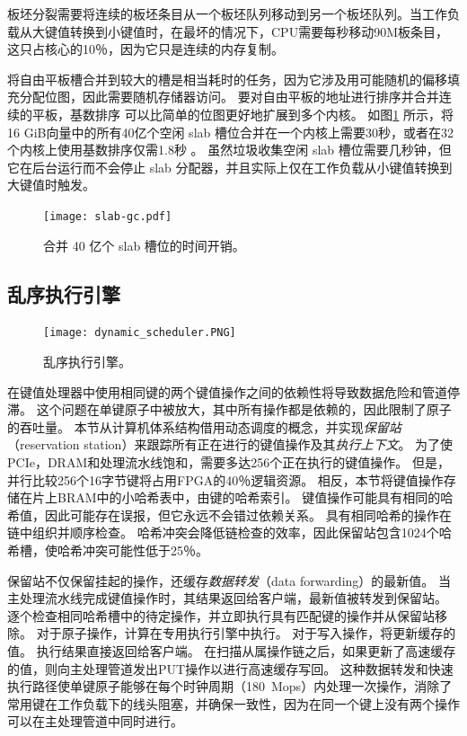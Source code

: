 板坯分裂需要将连续的板坯条目从一个板坯队列移动到另一个板坯队列。当工作负载从大键值转换到小键值时，在最坏的情况下，CPU需要每秒移动90M板条目，这只占核心的10％，因为它只是连续的内存复制。

将自由平板槽合并到较大的槽是相当耗时的任务，因为它涉及用可能随机的偏移填充分配位图，因此需要随机存储器访问。
要对自由平板的地址进行排序并合并连续的平板，基数排序 \cite {satish2010fast} 可以比简单的位图更好地扩展到多个内核。
如图\ref {kvdirect:fig:slab-garbage-collection} 所示，将16 GiB向量中的所有40亿个空闲 slab 槽位合并在一个内核上需要30秒，或者在32个内核上使用基数排序仅需1.8秒 \cite{satish2010fast}。
虽然垃圾收集空闲 slab 槽位需要几秒钟，但它在后台运行而不会停止 slab 分配器，并且实际上仅在工作负载从小键值转换到大键值时触发。


\begin{figure}[t]
	\centering
	\texttt{[image: slab-gc.pdf]}
	\caption{合并 40 亿个 slab 槽位的时间开销。}
	\label{kvdirect:fig:slab-garbage-collection}
\end{figure}




\subsection{乱序执行引擎}
\label{kvdirect:sec:ooo}

\begin{figure}[htbp]
\centering
\texttt{[image: dynamic\_scheduler.PNG]}
\caption{乱序执行引擎。}
\label{kvdirect:fig:ooo-mem-access}
\end{figure}

在键值处理器中使用相同键的两个键值操作之间的依赖性将导致数据危险和管道停滞。
这个问题在单键原子中被放大，其中所有操作都是依赖的，因此限制了原子的吞吐量。
本节从计算机体系结构借用动态调度的概念，并实现\textit {保留站}（reservation station）来跟踪所有正在进行的键值操作及其\textit {执行上下文}。
为了使PCIe，DRAM和处理流水线饱和，需要多达256个正在执行的键值操作。
但是，并行比较256个16字节键将占用FPGA的40％逻辑资源。
相反，本节将键值操作存储在片上BRAM中的小哈希表中，由键的哈希索引。
键值操作可能具有相同的哈希值，因此可能存在误报，但它永远不会错过依赖关系。
具有相同哈希的操作在链中组织并顺序检查。
哈希冲突会降低链检查的效率，因此保留站包含1024个哈希槽，使哈希冲突可能性低于25％。

保留站不仅保留挂起的操作，还缓存\textit {数据转发}（data forwarding）的最新值。
当主处理流水线完成键值操作时，其结果返回给客户端，最新值被转发到保留站。
逐个检查相同哈希槽中的待定操作，并立即执行具有匹配键的操作并从保留站移除。
对于原子操作，计算在专用执行引擎中执行。
对于写入操作，将更新缓存的值。
执行结果直接返回给客户端。
在扫描从属操作链之后，如果更新了高速缓存的值，则向主处理管道发出PUT操作以进行高速缓存写回。
这种数据转发和快速执行路径使单键原子能够在每个时钟周期（180~Mops）内处理一次操作，消除了常用键在工作负载下的线头阻塞，并确保一致性，因为在同一个键上没有两个操作可以在主处理管道中同时进行。


